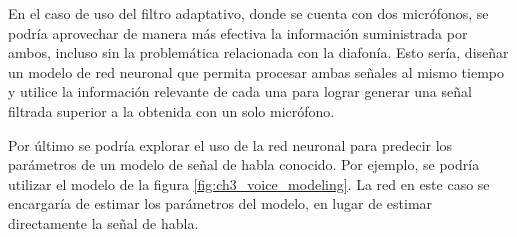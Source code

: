 En el caso de uso del filtro adaptativo, donde se cuenta con dos micrófonos, se podría aprovechar de manera más efectiva la información suministrada por ambos, incluso sin la problemática relacionada con la diafonía. Esto sería, diseñar un modelo de red neuronal que permita procesar ambas señales al mismo tiempo y utilice la información relevante de cada una para lograr generar una señal filtrada superior a la obtenida con un solo micrófono.

Por último se podría explorar el uso de la red neuronal para predecir los parámetros de un modelo de señal de habla conocido. Por ejemplo, se podría utilizar el modelo de la figura \ref{fig:ch3_voice_modeling}. La red en este caso se encargaría de estimar los parámetros del modelo, en lugar de estimar directamente la señal de habla.